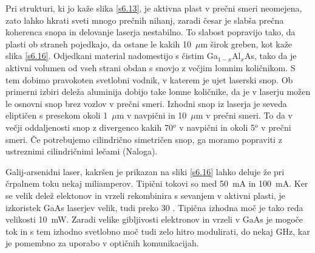 Pri strukturi, ki jo kaže slika \ref{s6.13}, je aktivna plast v prečni
smeri neomejena, zato lahko hkrati sveti mnogo prečnih nihanj, zaradi
česar je slabša prečna koherenca snopa in delovanje laserja nestabilno.
To slabost popravijo tako, da plasti ob straneh pojedkajo, da ostane le
kakih 10~$\mu$m širok greben, kot kaže slika \ref{s6.16}. Odjedkani
material nadomestijo s čistim Ga$_{1-x}$Al$_x$As, tako da je aktivni
volumen od vseh strani obdan s snovjo z večjim lomnim količnikom. S tem
dobimo pravokoten svetlobni vodnik, v katerem je ujet laserski snop. Ob
primerni izbiri deleža aluminija dobijo take lomne količnike, da je v
laserju možen le osnovni snop brez vozlov v prečni smeri. Izhodni snop iz
laserja je seveda eliptičen s presekom okoli 1~$\mu$m v navpični in 10~$\mu
$m v prečni smeri. To da v večji oddaljenosti snop z divergenco kakih 70$^o
$ v navpični in okoli 5$^o$ v prečni smeri. Če potrebujemo cilindrično
simetričen snop, ga moramo popraviti z ustreznimi cilindričnimi lečami
(Naloga).

Galij-arsenidni laser, kakršen je prikazan na sliki \ref{s6.16} lahko
deluje že pri črpalnem toku nekaj miliamperov. Tipični tokovi so med
50~mA in 100~mA. Ker se velik delež elektonov in vrzeli rekombinira s
sevanjem v aktivni plasti, je izkoristek GaAs laserjev velik, tudi preko 30
. Tipična izhodna moč je tako reda velikosti
10~mW. Zaradi velike gibljivosti elektronov in vrzeli v GaAs je mogoče tok
in s tem izhodno svetlobno moč tudi zelo hitro modulirati, do nekaj GHz,
kar je pomembno za uporabo v optičnih komunikacijah.
